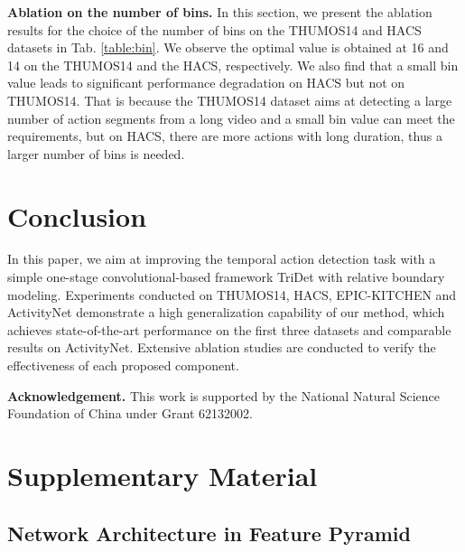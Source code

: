 \documentclass[10pt,twocolumn,letterpaper]{article}
\newcommand{\tabref}[1]{Tab. \ref{#1}}
\newcommand{\myPara}[1]{\vspace{.05in}\noindent\textbf{#1}}
\begin{document}
\myPara{Ablation on the number of bins.}
In this section, we present the ablation results for the choice of the number of bins on the THUMOS14 and HACS datasets in \tabref{table:bin}. We observe the optimal value is obtained at 16 and 14 on the THUMOS14 and the HACS, respectively. We also find that a small bin value leads to significant performance degradation on HACS but not on THUMOS14. That is because the THUMOS14 dataset aims at detecting a large number of action segments from a long video and a small bin value can meet the requirements, but on HACS, there are more actions with long duration, thus a larger number of bins is needed. 








\section{Conclusion}
In this paper, we aim at improving the temporal action detection task with a simple one-stage convolutional-based framework TriDet with relative boundary modeling. Experiments conducted on THUMOS14, HACS, EPIC-KITCHEN and ActivityNet demonstrate a high generalization capability of our method, which achieves state-of-the-art performance on the first three datasets and comparable results on ActivityNet. Extensive ablation studies are conducted to verify the effectiveness of each proposed component.

\noindent\textbf{Acknowledgement.} 
This work is supported by the National Natural Science Foundation of China under Grant 62132002.


{\small


}
\clearpage
\appendix

\section{Supplementary Material}
\subsection{Network Architecture in Feature Pyramid}

\label{sec:self2cnn}
\end{document}
